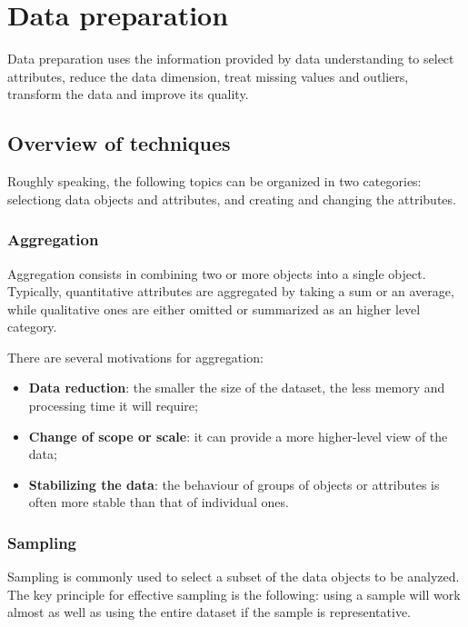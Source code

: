 \chapter{Data preparation}

Data preparation uses the information provided by data understanding to select attributes, reduce the data dimension, treat missing values and outliers, transform the data and improve its quality.

\section{Overview of techniques}

Roughly speaking, the following topics can be organized in two categories: selectiong data objects and attributes, and creating and changing the attributes.

\subsection{Aggregation}

Aggregation consists in combining two or more objects into a single object. Typically, quantitative attributes are aggregated by taking a sum or an average, while qualitative ones are either omitted or summarized as an higher level category.

There are several motivations for aggregation:

\begin{itemize}
    \item \textbf{Data reduction}: the smaller the size of the dataset, the less memory and processing time it will require;

    \item \textbf{Change of scope or scale}: it can provide a more higher-level view of the data;

    \item \textbf{Stabilizing the data}: the behaviour of groups of objects or attributes is often more stable than that of individual ones. 
\end{itemize}

\subsection{Sampling}

Sampling is commonly used to select a subset of the data objects to be analyzed. The key principle for effective sampling is the following: using a sample will work almost as well as using the entire dataset if the sample is representative.

